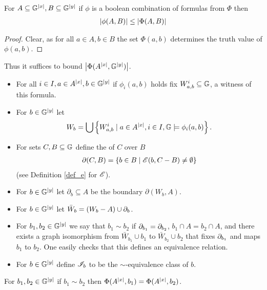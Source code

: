 \begin{Lemma}
  For $A \subseteq \mathbb G^{|x|}, B \subseteq \mathbb G^{|y|}$
  if $\phi$ is a boolean combination of formulas from $\Phi$ then
  \begin{align*}
    \left|\phi(A, B)\right| \leq \left|\Phi(A, B)\right|
  \end{align*}  
\end{Lemma}
\begin{proof}
  Clear, as for all $a \in A, b \in B$ the set $\Phi(a,b)$ determines the truth value of $\phi(a,b)$.
\end{proof}

Thus it suffices to bound  $\left|\Phi(A^{|x|}, \mathbb G^{|y|})\right|$.

\begin{Definition} \;
  \begin{itemize}
  \item For all $i \in I, a \in A^{|x|}, b \in \mathbb G^{|y|}$ if $\phi_i(a, b)$ holds fix $W^i_{a,b} \subseteq \mathbb G$, a witness of this formula.
  \item For $b \in \mathbb G^{|y|}$ let 
    \begin{align*}
      W_b = \bigcup \left\{W^i_{a,b} \mid a \in A^{|x|}, i \in I, \mathbb G \models \phi_i(a,b)\right\}.
    \end{align*}
  \item For sets $C, B \subseteq \mathbb G$ define the  of $C$ over $B$
    \begin{align*}
      \partial(C, B) = \left\{b \in B \mid \mathscr E(b, C - B) \neq \emptyset\right\}
    \end{align*}
    (see Definition \ref{def_e} for $\mathscr E$).
  \item For $b \in \mathbb G^{|y|}$ let $\partial_b \subseteq A$ be the boundary $\partial(W_b, A)$.
  \item For $b \in \mathbb G^{|y|}$ let $\bar W_b = (W_b - A) \cup \partial_b$.
  \item For $b_1, b_2 \in \mathbb G^{|y|}$ we say that $b_1 \sim b_2$ if $\partial_{b_1} = \partial_{b_2}$,
    $b_1 \cap A = b_2 \cap A$,
    and there exists a graph isomorphism from $\bar W_{b_1} \cup b_1$ to $\bar W_{b_2} \cup b_2$ that fixes $\partial_{b_1}$ and
    maps $b_1$ to $b_2$.
    One easily checks that this defines an equivalence relation.
  \item For $b \in \mathbb G^{|y|}$ define $\mathscr I_b$ to be the $\sim$-equivalence class of $b$.
  \end{itemize}
\end{Definition}

\begin{Lemma} \label {bound_trace}
  For $b_1, b_2 \in \mathbb G^{|y|}$ if $b_1 \sim b_2$ then $\Phi(A^{|x|}, b_1) = \Phi(A^{|x|}, b_2)$.
\end{Lemma}


